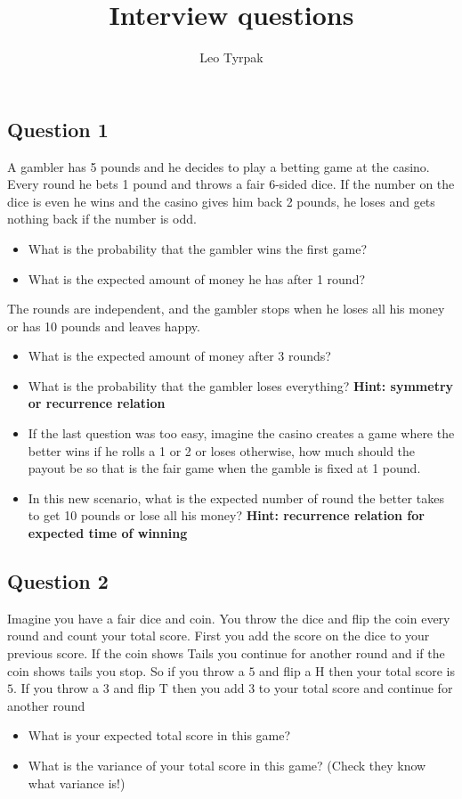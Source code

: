 \documentclass{article}
\title{Interview questions}
\author{Leo Tyrpak}
\begin{document}
\maketitle
\subsection{Question 1}

A gambler has 5 pounds and he decides to play a betting game at the casino.
Every round he bets 1 pound and throws a fair 6-sided dice.
If the number on the dice is even he wins and the casino gives him back 2 pounds, he loses and gets nothing back if the number is odd.
\begin{itemize}
    \item What is the probability that the gambler wins the first game?
    \item What is the expected amount of money he has
    after 1 round?
\end{itemize}
The rounds are independent, and the gambler stops when he loses all his money or has 10 pounds and leaves happy.

\begin{itemize}
    \item What is the expected amount of money after 3 rounds?
    \item What is the probability that the gambler loses everything? \textbf{Hint: symmetry or recurrence relation}
    \item If the last question was too easy, imagine the casino creates a game where the better wins if he rolls a 1 or 2 or loses otherwise, how much should the payout be so that is the fair game when the gamble is fixed at 1 pound.
    \item In this new scenario, what is the expected number of round the better takes to get 10 pounds or lose all his money?
    \textbf{Hint: recurrence relation for expected time of winning}
\end{itemize}

\subsection{Question 2}
Imagine you have a fair dice and coin.
You throw the dice and flip the coin every round and count your total score.
First you add the score on the dice to your previous score.
If the coin shows Tails you continue for another round and if the coin shows tails you stop.
So if you throw a $5$ and flip a H then your total score is $5$.
If you throw a $3$ and flip T then you add $3$ to your total score and continue for another round
\begin{itemize}
    \item What is your expected total score in this game?
    \item What is the variance of your total score in this game? (Check they know what variance is!)
\end{itemize}
\end{document}
